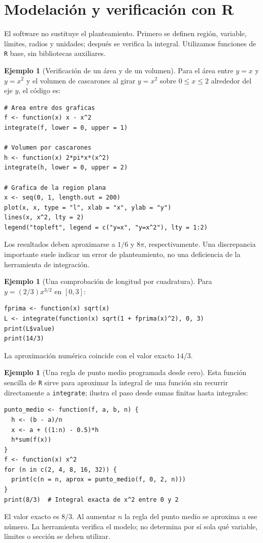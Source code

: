 \documentclass[12pt]{article}
\theoremstyle{definition}
\newtheorem{ejemplo}[teorema]{Ejemplo}
\theoremstyle{remark}
\begin{document}
\section{Modelación y verificación con R}
El software no sustituye el planteamiento. Primero se definen región, variable, límites, radios y unidades; después se verifica la integral. Utilizamos funciones de \texttt{R} base, sin bibliotecas auxiliares.
\begin{ejemplo}[Verificación de un área y de un volumen]
Para el área entre $y=x$ y $y=x^2$ y el volumen de cascarones al girar $y=x^2$ sobre $0\le x\le2$ alrededor del eje $y$, el código es:
\par\medskip
\begin{verbatim}
# Area entre dos graficas
f <- function(x) x - x^2
integrate(f, lower = 0, upper = 1)

# Volumen por cascarones
h <- function(x) 2*pi*x*(x^2)
integrate(h, lower = 0, upper = 2)

# Grafica de la region plana
x <- seq(0, 1, length.out = 200)
plot(x, x, type = "l", xlab = "x", ylab = "y")
lines(x, x^2, lty = 2)
legend("topleft", legend = c("y=x", "y=x^2"), lty = 1:2)
\end{verbatim}
Los resultados deben aproximarse a $1/6$ y $8\pi$, respectivamente. Una discrepancia importante suele indicar un error de planteamiento, no una deficiencia de la herramienta de integración.
\end{ejemplo}
\begin{ejemplo}[Una comprobación de longitud por cuadratura]
Para $y=(2/3)x^{3/2}$ en $[0,3]$:
\par\medskip
\begin{verbatim}
fprima <- function(x) sqrt(x)
L <- integrate(function(x) sqrt(1 + fprima(x)^2), 0, 3)
print(L$value)
print(14/3)
\end{verbatim}
La aproximación numérica coincide con el valor exacto $14/3$.
\end{ejemplo}


\begin{ejemplo}[Una regla de punto medio programada desde cero]
Esta función sencilla de \texttt{R} sirve para aproximar la integral de una función sin recurrir directamente a \texttt{integrate}; ilustra el paso desde sumas finitas hasta integrales:
\begin{verbatim}
punto_medio <- function(f, a, b, n) {
  h <- (b - a)/n
  x <- a + ((1:n) - 0.5)*h
  h*sum(f(x))
}
f <- function(x) x^2
for (n in c(2, 4, 8, 16, 32)) {
  print(c(n = n, aprox = punto_medio(f, 0, 2, n)))
}
print(8/3)  # Integral exacta de x^2 entre 0 y 2
\end{verbatim}
El valor exacto es $8/3$. Al aumentar $n$ la regla del punto medio se aproxima a ese número. La herramienta verifica el modelo; no determina por sí sola qué variable, límites o sección se deben utilizar.
\end{ejemplo}
\end{document}
